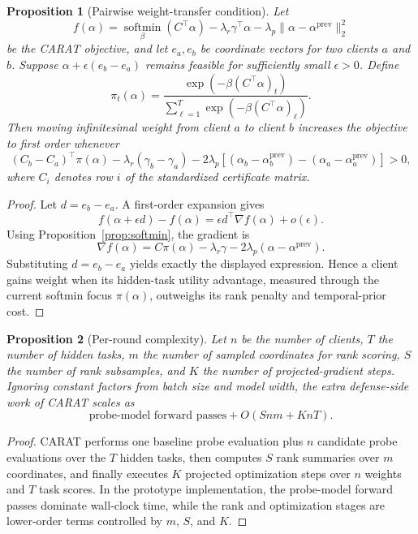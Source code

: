 \documentclass{article}
\newcommand{\softmin}{\operatorname*{softmin}}
\newtheorem{proposition}{Proposition}[section]
\begin{document}
\begin{proposition}[Pairwise weight-transfer condition]
\label{prop:pairwise-transfer}
Let
\[
f(\alpha)=\softmin_{\beta}(C^\top\alpha)-\lambda_r \gamma^\top\alpha-\lambda_p\|\alpha-\alpha^{\mathrm{prev}}\|_2^2
\]
be the CARAT objective, and let $e_a,e_b$ be coordinate vectors for two clients $a$ and $b$. Suppose $\alpha+\epsilon(e_b-e_a)$ remains feasible for sufficiently small $\epsilon>0$. Define
\[
\pi_t(\alpha)=\frac{\exp(-\beta (C^\top\alpha)_t)}
{\sum_{\ell=1}^T \exp(-\beta (C^\top\alpha)_\ell)}.
\]
Then moving infinitesimal weight from client $a$ to client $b$ increases the objective to first order whenever
\[
(C_b-C_a)^\top \pi(\alpha)
-\lambda_r(\gamma_b-\gamma_a)
-2\lambda_p\!\left[
(\alpha_b-\alpha_b^{\mathrm{prev}})
-(\alpha_a-\alpha_a^{\mathrm{prev}})
\right] > 0,
\]
where $C_i$ denotes row $i$ of the standardized certificate matrix.
\end{proposition}

\begin{proof}
Let $d=e_b-e_a$. A first-order expansion gives
\[
f(\alpha+\epsilon d)-f(\alpha)
=\epsilon d^\top\nabla f(\alpha)+o(\epsilon).
\]
Using Proposition~\ref{prop:softmin}, the gradient is
\[
\nabla f(\alpha)=C\pi(\alpha)-\lambda_r \gamma-2\lambda_p(\alpha-\alpha^{\mathrm{prev}}).
\]
Substituting $d=e_b-e_a$ yields exactly the displayed expression. Hence a client gains weight when its hidden-task utility advantage, measured through the current softmin focus $\pi(\alpha)$, outweighs its rank penalty and temporal-prior cost.
\end{proof}

\begin{proposition}[Per-round complexity]
\label{prop:complexity}
Let $n$ be the number of clients, $T$ the number of hidden tasks, $m$ the number of sampled coordinates for rank scoring, $S$ the number of rank subsamples, and $K$ the number of projected-gradient steps. Ignoring constant factors from batch size and model width, the extra defense-side work of CARAT scales as
\[
\text{probe-model forward passes} + O(Snm + KnT).
\]
\end{proposition}

\begin{proof}
CARAT performs one baseline probe evaluation plus $n$ candidate probe evaluations over the $T$ hidden tasks, then computes $S$ rank summaries over $m$ coordinates, and finally executes $K$ projected optimization steps over $n$ weights and $T$ task scores. In the prototype implementation, the probe-model forward passes dominate wall-clock time, while the rank and optimization stages are lower-order terms controlled by $m$, $S$, and $K$.
\end{proof}
\end{document}
